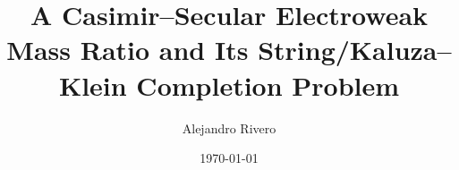 \documentclass[aps,prc,preprint,nofootinbib,superscriptaddress]{revtex4-2}
\begin{document}
\title{A Casimir--Secular Electroweak Mass Ratio and Its String/Kaluza--Klein Completion Problem}

\author{Alejandro Rivero}

\date{\today}

\begin{abstract}

\end{abstract}

\maketitle











\appendix





\end{document}

